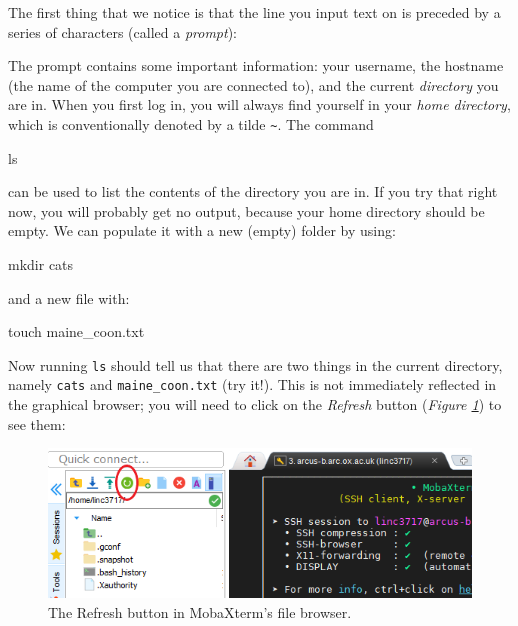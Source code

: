\documentclass[10pt]{article}
\newcommand{\figref}[1]{\textit{Figure \ref{fig:#1}}}
\begin{document}
The first thing that we notice is that the line you input text on is preceded by a series of characters (called a \textit{prompt}):


The prompt contains some important information: your username, the hostname (the name of the computer you are connected to), and the current \textit{directory} you are in. When you first log in, you will always find yourself in your \textit{home directory}, which is conventionally denoted by a tilde \texttt{\textasciitilde}. The command 

\begin{cmdline}
ls
\end{cmdline}

can be used to list the contents of the directory you are in. If you try that right now, you will probably get no output, because your home directory should be empty. We can populate it with a new (empty) folder by using:

\begin{cmdline}
mkdir cats
\end{cmdline}

and a new file with:

\begin{cmdline}
touch maine_coon.txt
\end{cmdline}

Now running \texttt{ls} should tell us that there are two things in the current directory, namely \texttt{cats} and \texttt{maine\_coon.txt} (try it!). This is not immediately reflected in the graphical browser; you will need to click on the \textit{Refresh} button (\figref{refresh}) to see them:

\begin{figure}[H]
    \centering
    \includegraphics[scale=0.6]{./img/refresh}
    \caption{The Refresh button in MobaXterm's file browser.}
    \label{fig:refresh}
\end{figure}
\end{document}
